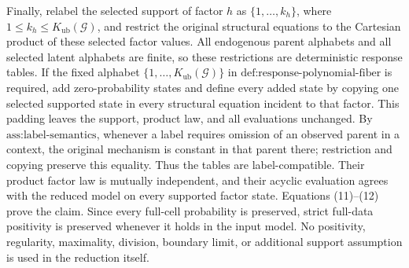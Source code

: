 Finally, relabel the selected support of factor \(h\) as \(\{1,\ldots,k_h\}\), where \(1\leq k_h\leq K_{\mathrm{ub}}(\mathcal G)\), and restrict the original structural equations to the Cartesian product of these selected factor values. All endogenous parent alphabets and all selected latent alphabets are finite, so these restrictions are deterministic response tables. If the fixed alphabet \(\{1,\ldots,K_{\mathrm{ub}}(\mathcal G)\}\) in \(\text{def:response-polynomial-fiber}\) is required, add zero-probability states and define every added state by copying one selected supported state in every structural equation incident to that factor. This padding leaves the support, product law, and all evaluations unchanged. By \(\text{ass:label-semantics}\), whenever a label requires omission of an observed parent in a context, the original mechanism is constant in that parent there; restriction and copying preserve this equality. Thus the tables are label-compatible. Their product factor law is mutually independent, and their acyclic evaluation agrees with the reduced model on every supported factor state. Equations (11)--(12) prove the claim. Since every full-cell probability is preserved, strict full-data positivity is preserved whenever it holds in the input model. No positivity, regularity, maximality, division, boundary limit, or additional support assumption is used in the reduction itself.